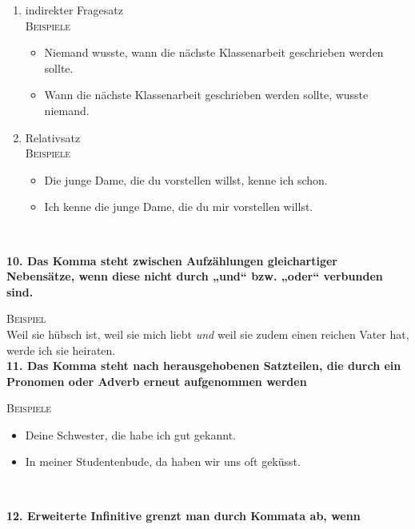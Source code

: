 \documentclass[landscape]{article}
\newcommand{\tbreak}{\\\vspace{-3mm}}
\newcommand*\glqq{„}
\newcommand*\grqq{“}
\newcommand{\gqm}[1]{\glqq #1\grqq}
\begin{document}
\begin{multicols*}{3}
\begin{enumerate}[label=(\alph*)]
        \item indirekter Fragesatz\\
            \textsc{Beispiele}\\

            \begin{itemize}
                \item Niemand wusste, wann die nächste Klassenarbeit geschrieben werden sollte.
                \item Wann die nächste Klassenarbeit geschrieben werden sollte, wusste niemand.
            \end{itemize}\quad\vspace{-4mm}

        \item Relativsatz\\
            \textsc{Beispiele}\\

            \begin{itemize}
                \item Die junge Dame, die du vorstellen willst, kenne ich schon.
                \item Ich kenne die junge Dame, die du mir vorstellen willst.
            \end{itemize}
    \end{enumerate}\quad\tbreak

    \textbf{10. Das Komma steht zwischen Aufzählungen gleichartiger Nebensätze, wenn diese nicht durch \gqm{und} bzw. \gqm{oder} verbunden sind.}\tbreak
        
    \textsc{Beispiel}\\
    Weil sie hübsch ist, weil sie mich liebt \textit{und} weil sie zudem einen reichen Vater hat, werde ich sie heiraten.\\

    \textbf{11. Das Komma steht nach herausgehobenen Satzteilen, die durch ein Pronomen oder Adverb erneut aufgenommen werden}\tbreak

    \textsc{Beispiele}\\

    \begin{itemize}
        \item Deine Schwester, die habe ich gut gekannt.
        \item In meiner Studentenbude, da haben wir uns oft geküsst.
    \end{itemize}\quad\tbreak

    \textbf{12. Erweiterte Infinitive grenzt man durch Kommata ab, wenn}\\


\end{multicols*}
\end{document}
